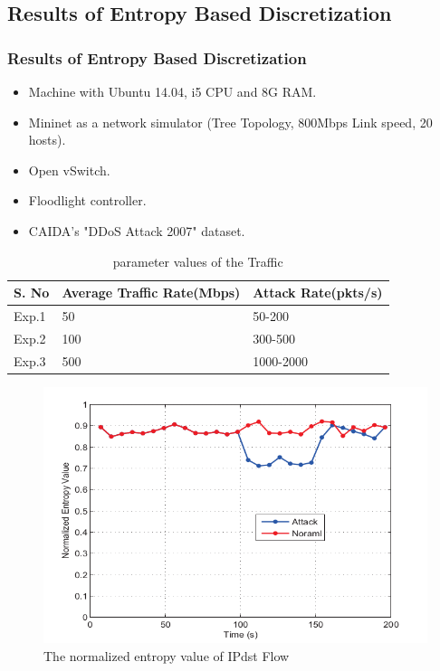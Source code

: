 \documentclass[10pt]{beamer}
\begin{document}
\begin{frame}
\section[]{Results of Entropy Based Discretization}
\frametitle{Results of Entropy Based Discretization}
\begin{itemize}
\footnotesize
\item
Machine with Ubuntu 14.04, i5 CPU and 8G RAM.
\item
Mininet as a network simulator (Tree Topology, 800Mbps Link speed, 20 hosts).
\item
Open vSwitch.
\item 
Floodlight controller.
\item
CAIDA's "DDoS Attack 2007" dataset.
\end{itemize}
\scriptsize
\vspace{0.1cm}
\begin{table}
\begin{center}
\begin{tabular}{ | m{2cm} | m{2cm}| m{2cm} |} 
\hline
\textbf{S. No} & \textbf{Average Traffic Rate(Mbps)} & \textbf{Attack Rate(pkts/s)} \\
\hline
Exp.1 &
50 &
50-200 \\
\hline
Exp.2 &
100 &
300-500 \\ 
\hline
Exp.3 &
500 &
1000-2000 \\
\hline
\end{tabular}
\end{center}
\caption{parameter values of the Traffic}
\end{table}
\begin{figure}[h]
\includegraphics[scale=0.2]{Entropy.png}
\caption{\footnotesize The normalized entropy value of IPdst Flow}
\end{figure}

\end{frame}
\end{document}
